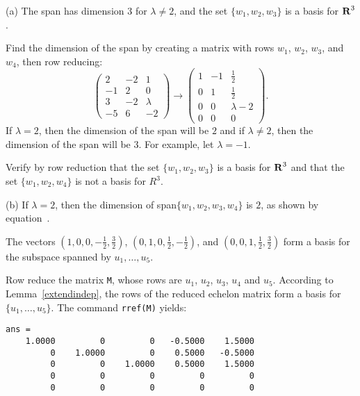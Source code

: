 (a) \ans The span has dimension $3$ for $\lambda \neq 2$, and 
the set $\{w_1,w_2,w_3\}$ is a basis for $\mbox{$\bf{R}$}^3$.

\soln Find the dimension of the span by creating a matrix with rows
$w_1$, $w_2$, $w_3$, and $w_4$, then row reducing:
\begin{equation} \label{exeq:5.6.4}
\left(\begin{array}{rrr} 2 & -2 & 1 \\ -1 & 2 & 0 \\ 3 & -2 &
\lambda \\ -5 & 6 & -2 \end{array}\right) \longrightarrow
\left(\begin{array}{rrc} 1 & -1 & \frac{1}{2} \\ 0 & 1 & \frac{1}{2}
\\ 0 & 0 & \lambda - 2 \\ 0 & 0 & 0 \end{array}\right).
\end{equation}
If $\lambda = 2$, then the dimension of the span will
be $2$ and if $\lambda \neq 2$, then the dimension of the span
will be $3$.  For example, let $\lambda = -1$.

\para Verify by row reduction that the set $\{w_1,w_2,w_3\}$ is a basis
for $\mbox{$\bf{R}$}^3$ and that the set $\{w_1,w_2,w_4\}$ is not a basis for $R^3$. 

(b) If $\lambda = 2$, then the dimension of span$\{w_1,w_2,w_3,w_4\}$
is $2$, as shown by equation~.

\ans The vectors $(1,0,0,-\frac{1}{2},\frac{3}{2})$, $(0,1,0,\frac{1}{2},
-\frac{1}{2})$, and $(0,0,1,\frac{1}{2},\frac{3}{2})$ form a basis
for the subspace spanned by $u_1, \dots ,u_5$.

\soln Row reduce the matrix {\tt M}, whose
rows are $u_1$, $u_2$, $u_3$, $u_4$ and $u_5$.  According to 
Lemma~\ref{extendindep}, the rows of the
reduced echelon matrix form a basis for $\{u_1,\dots ,u_5\}$.  The
command {\tt rref(M)} yields:
\begin{verbatim}
ans =
    1.0000         0         0   -0.5000    1.5000
         0    1.0000         0    0.5000   -0.5000
         0         0    1.0000    0.5000    1.5000
         0         0         0         0         0
         0         0         0         0         0
\end{verbatim}










